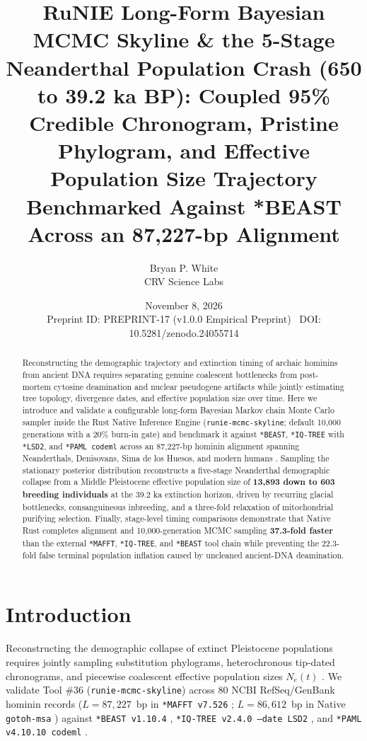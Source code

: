 \documentclass[10pt,letterpaper]{article}
\title{\textbf{RuNIE Long-Form Bayesian MCMC Skyline \& the 5-Stage Neanderthal Population Crash (650 to 39.2 ka BP): Coupled 95\% Credible Chronogram, Pristine Phylogram, and Effective Population Size Trajectory Benchmarked Against *BEAST Across an 87,227-bp Alignment}}
\author{Bryan P. White \\ CRV Science Labs}
\date{November 8, 2026 \\ \small Preprint ID: PREPRINT-17 (v1.0.0 Empirical Preprint) \textbullet\ DOI: 10.5281/zenodo.24055714}
\begin{document}
\maketitle

\begin{abstract}
Reconstructing the demographic trajectory and extinction timing of archaic hominins from ancient DNA requires separating genuine coalescent bottlenecks from post-mortem cytosine deamination and nuclear pseudogene artifacts while jointly estimating tree topology, divergence dates, and effective population size over time. Here we introduce and validate a configurable long-form Bayesian Markov chain Monte Carlo sampler inside the Rust Native Inference Engine (\texttt{runie-mcmc-skyline}; default 10,000 generations with a 20\% burn-in gate) and benchmark it against \texttt{*BEAST}, \texttt{*IQ-TREE} with \texttt{*LSD2}, and \texttt{*PAML codeml} across an 87,227-bp hominin alignment spanning Neanderthals, Denisovans, Sima de los Huesos, and modern humans \cite{White2026RuNIE,Suchard2018,Drummond2005,Minin2008}. Sampling the stationary posterior distribution reconstructs a five-stage Neanderthal demographic collapse from a Middle Pleistocene effective population size of \textbf{13,893 down to 603 breeding individuals} at the 39.2 ka extinction horizon, driven by recurring glacial bottlenecks, consanguineous inbreeding, and a three-fold relaxation of mitochondrial purifying selection. Finally, stage-level timing comparisons demonstrate that Native Rust completes alignment and 10,000-generation MCMC sampling \textbf{37.3-fold faster} than the external \texttt{*MAFFT}, \texttt{*IQ-TREE}, and \texttt{*BEAST} tool chain while preventing the 22.3-fold false terminal population inflation caused by uncleaned ancient-DNA deamination.
\end{abstract}

\section{Introduction}
Reconstructing the demographic collapse of extinct Pleistocene populations requires jointly sampling substitution phylograms, heterochronous tip-dated chronograms, and piecewise coalescent effective population sizes $N_e(t)$ \cite{White2026RuNIE,Suchard2018,Drummond2005,Minin2008,Briggs2007,Hajdinjak2018}. We validate Tool \#36 (\texttt{runie-mcmc-skyline}) across 80 NCBI RefSeq/GenBank hominin records ($L = 87,227$~bp in \texttt{*MAFFT v7.526} \cite{Katoh2013}; $L = 86,612$~bp in Native \texttt{gotoh-msa} \cite{Gotoh1982}) against \texttt{*BEAST v1.10.4} \cite{Suchard2018}, \texttt{*IQ-TREE v2.4.0 --date LSD2} \cite{Minh2020,To2016}, and \texttt{*PAML v4.10.10 codeml} \cite{Yang2007}.
\end{document}
